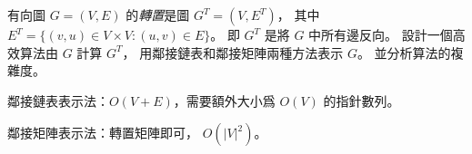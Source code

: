 \startEXERCISE
有向圖 $G=(V,E)$ 的\emph{轉置}是圖 $G^T=(V,E^T)$，
其中 $E^T=\{(v,u)\in V \times V:(u,v)\in E\}$。
即 $G^T$ 是將 $G$ 中所有邊反向。
設計一個高效算法由 $G$ 計算 $G^T$，
用鄰接鏈表和鄰接矩陣兩種方法表示 $G$。
並分析算法的複雜度。
\stopEXERCISE

\startANSWER
鄰接鏈表表示法：$O(V+E)$，需要額外大小爲 $O(V)$ 的指針數列。

鄰接矩陣表示法：轉置矩陣即可， $O(|V|^2)$。
\stopANSWER
